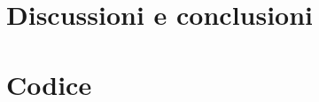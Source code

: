\documentclass[11pt,a4paper]{article} %
\begin{document}
{%
% 	

 	




	
\section{Discussioni e conclusioni}
	
	
\newpage
\section{Codice}
} 	%

	
	
\end{document}
